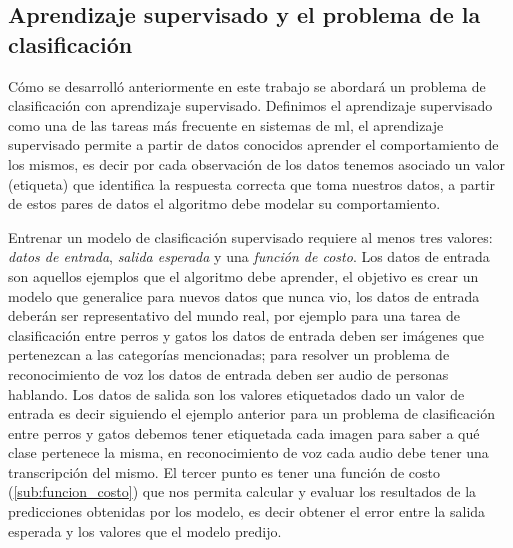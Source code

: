 \subsection{Aprendizaje supervisado y el problema de la clasificación}\label{sub:aprendizaje_supervisado}

Cómo se desarrolló anteriormente en este trabajo se abordará un problema de clasificación con aprendizaje supervisado. Definimos  el aprendizaje supervisado como una de las tareas más frecuente en sistemas de \ac{ml}, el aprendizaje supervisado permite a partir de datos conocidos aprender el comportamiento de los mismos, es decir por cada observación de los datos tenemos asociado un valor (etiqueta) que identifica la respuesta correcta que toma nuestros datos, a partir de estos pares de datos el algoritmo debe modelar su comportamiento. 


Entrenar un modelo de clasificación supervisado requiere al menos tres valores:  \textit{datos de entrada}, \textit{salida esperada} y una \textit{función de costo}.  Los datos de entrada son aquellos ejemplos que el algoritmo debe aprender, el objetivo es crear un modelo que generalice para nuevos datos que nunca vio, los datos de entrada deberán ser representativo del mundo real, por ejemplo para una tarea de clasificación entre perros y gatos los datos de entrada deben ser imágenes que pertenezcan a las categorías mencionadas; para resolver un problema de reconocimiento de voz los datos de entrada deben ser audio de personas hablando. Los datos de salida son los valores etiquetados dado un valor de entrada es decir siguiendo el ejemplo anterior para un problema de clasificación entre perros y gatos debemos tener etiquetada cada imagen para saber a qué clase pertenece la misma, en reconocimiento de voz cada audio debe tener una transcripción del mismo. El tercer punto es tener una función de costo (\ref{sub:funcion_costo}) que nos permita calcular y evaluar  los resultados de la predicciones obtenidas por los modelo, es decir obtener el error entre la salida esperada y los valores que el modelo predijo.

